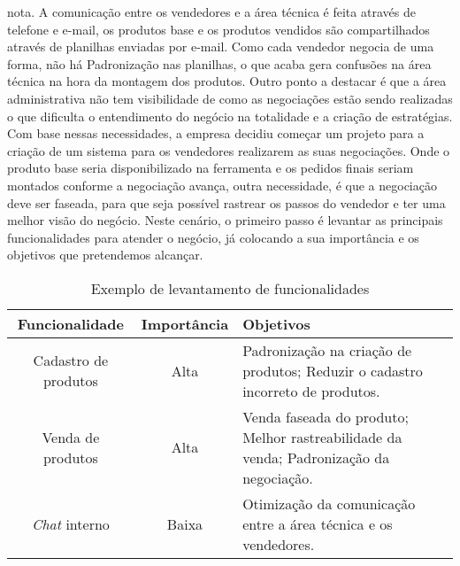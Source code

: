       nota. A comunicação entre os vendedores e a área técnica é feita através de
      telefone e e-mail, os produtos base e os produtos vendidos são compartilhados
      através de planilhas enviadas por e-mail. Como cada vendedor negocia de uma
      forma, não há Padronização nas planilhas, o que acaba gera confusões na área
      técnica na hora da montagem dos produtos. Outro ponto a destacar é que a área
      administrativa não tem visibilidade de como as negociações estão sendo realizadas
      o que dificulta o entendimento do negócio na totalidade e a criação de
      estratégias. \newline
      Com base nessas necessidades, a empresa decidiu começar um projeto para a
      criação de um sistema para os vendedores realizarem as suas negociações.
      Onde o produto base seria disponibilizado na ferramenta e os pedidos finais
      seriam montados conforme a negociação avança, outra necessidade, é que a
      negociação deve ser faseada, para que seja possível rastrear os passos do
      vendedor e ter uma melhor visão do negócio. \newline
      Neste cenário, o primeiro passo é levantar as principais funcionalidades para
      atender o negócio, já colocando a sua importância e os objetivos que pretendemos
      alcançar.

      \begin{table}[h!]
        \centering
        \begin{tabular}{|c|c|p{8cm}|}
          \hline
          \textbf{Funcionalidade} &
          \textbf{Importância}  &
          \textbf{Objetivos} \\ \hline
          Cadastro de produtos &
          Alta &
          Padronização na criação de produtos; \newline
          Reduzir o cadastro incorreto de produtos.
          \\ \hline
          Venda de produtos &
          Alta &
          Venda faseada do produto; \newline
          Melhor rastreabilidade da venda; \newline
          Padronização da negociação.
          \\ \hline
          \textit{Chat} interno &
          Baixa &
          Otimização da comunicação entre a área técnica e os vendedores.
          \\ \hline
        \end{tabular}
        \caption{Exemplo de levantamento de funcionalidades}
        \label{Tabela:2}
      \end{table}

